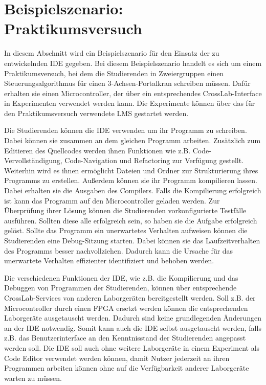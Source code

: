 \section{Beispielszenario: Praktikumsversuch}\label{section:anforderungsanalyse:beispielszenario}

In diesem Abschnitt wird ein Beispielszenario für den Einsatz der zu entwickelnden IDE gegeben. Bei diesem Beispielszenario handelt es sich um einem Praktikumsversuch, bei dem die Studierenden in Zweiergruppen einen Steuerungsalgorithmus für einen 3-Achsen-Portalkran schreiben müssen. Dafür erhalten sie einen Microcontroller, der über ein entsprechendes CrossLab-Interface in Experimenten verwendet werden kann. Die Experimente können über das für den Praktikumsversuch verwendete \ac{LMS} gestartet werden.

Die Studierenden können die IDE verwenden um ihr Programm zu schreiben. Dabei können sie zusammen an dem gleichen Programm arbeiten. Zusätzlich zum Editieren des Quellcodes werden ihnen Funktionen wie z.B. Code-Vervollständigung, Code-Navigation und Refactoring zur Verfügung gestellt. Weiterhin wird es ihnen ermöglicht Dateien und Ordner zur Strukturierung ihres Programms zu erstellen. Außerdem können sie ihr Programm kompilieren lassen. Dabei erhalten sie die Ausgaben des Compilers. Falls die Kompilierung erfolgreich ist kann das Programm auf den Microcontroller geladen werden. Zur Überprüfung ihrer Lösung können die Studierenden vorkonfigurierte Testfälle ausführen. Sollten diese alle erfolgreich sein, so haben sie die Aufgabe erfolgreich gelöst. Sollte das Programm ein unerwartetes Verhalten aufweisen können die Studierenden eine Debug-Sitzung starten. Dabei können sie das Laufzeitverhalten des Programms besser nachvollziehen. Dadurch kann die Ursache für das unerwartete Verhalten effizienter identifiziert und behoben werden.

Die verschiedenen Funktionen der IDE, wie z.B. die Kompilierung und das Debuggen von Programmen der Studierenden, können über entsprechende CrossLab-Services von anderen Laborgeräten bereitgestellt werden. Soll z.B. der Microcontroller durch einen FPGA ersetzt werden können die entsprechenden Laborgeräte ausgetauscht werden. Dadurch sind keine grundlegenden Änderungen an der IDE notwendig. Somit kann auch die IDE selbst ausgetauscht werden, falls z.B. das Benutzerinterface an den Kenntnisstand der Studierenden angepasst werden soll. Die IDE soll auch ohne weitere Laborgeräte in einem Experiment als Code Editor verwendet werden können, damit Nutzer jederzeit an ihren Programmen arbeiten können ohne auf die Verfügbarkeit anderer Laborgeräte warten zu müssen.
